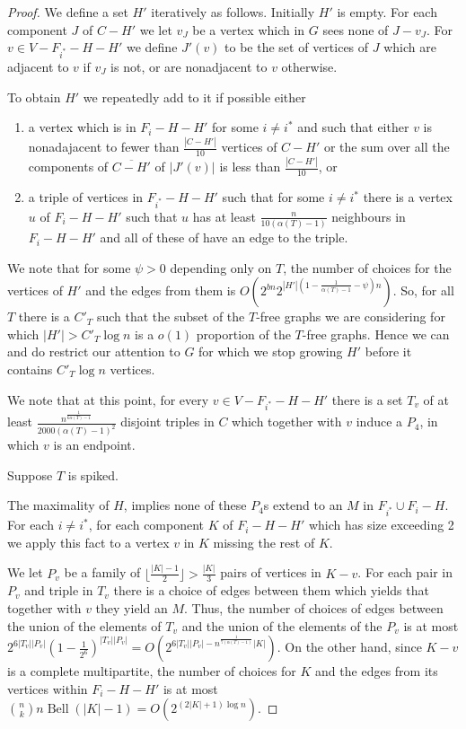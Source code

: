 \documentclass[10pt,a4paper]{amsart}
\DeclareMathOperator{\Bell}{Bell}
\begin{document}
\begin{proof}

We define a set $H'$ iteratively as follows. Initially $H'$ is empty. 
For each component $J$ of $C-H' $ we let $v_J$ be a vertex which in $G$ sees none of $J-v_J$. 
For $v\in V-F_{i^*}-H-H'$ we define $J'(v)$ to be the set of vertices of $J$ which are adjacent to $v$ if $v_J$ is not, or are nonadjacent to $v$ otherwise. 

To obtain  $H'$ we  repeatedly add to it  if possible either 
\begin{enumerate}
\item[(a)]  a vertex which  is  in $F_i-H-H'$ for some $i \neq {i^*}$  and such that either $v$ is nonadajacent to fewer than $\frac{|C-H'|}{10}$
vertices of $C-H'$ or the sum over all the components  of  $\overline{C-H'} $ of  $|J'(v)|$
is less than $\frac{|C-H'|}{10}$, or 
\item[(b)] a triple of vertices   in $F_{i^*}-H-H'$  such that  for some $i \neq {i^*}$  there is a vertex $u$ of $F_i-H-H'$ such that $u$  has at least
$\frac{n}{10(\alpha(T)-1)}$ neighbours in $F_i-H-H'$  and all of these of have an edge to the triple.  
\end{enumerate}

We note that for some $\psi>0$ depending only on $T$,  the number of choices for the vertices of $H'$ and the edges from them is $O(2^{bn}2^{|H'|(1-\frac{1}{\alpha(T)-1}-\psi)n})$. 
So, for all $T$ there is a $C'_T$ such that  the subset of the $T$-free graphs  we are considering for which $|H'|>C'_T \log n$ is a $o(1)$ proportion of the $T$-free graphs. 
Hence we can  and do restrict our attention to $G$ for which we stop growing $H'$ before it contains $C'_T \log n$ vertices. 


We note that at this point, for every $v \in V-F_{i^*}-H-H'$  there  is a set $T_v$ of at least $\frac{n^{\frac{1}{6\alpha(T)-1}}}{2000(\alpha(T)-1)^2}$ disjoint triples  in $C$ which together with $v$ induce a $P_4$, in which $v$ is an endpoint. 

Suppose $T$ is spiked. 

The maximality of $H$,  implies  none of these $P_4$s extend to an  $M$ in $F_{i^*} \cup F_i-H$.
For each $i \neq i^*$,  for each component $K$ of $F_i-H-H'$ which has size exceeding 2
we apply  this fact to a vertex  $v$ in $K$ missing the rest of $K$. 


We let $P_v$  be a family of $\lfloor \frac{|K|-1}{2} \rfloor>\frac{|K|}{3}$ pairs 
of vertices in $K-v$. For each pair in $P_v$ and triple in $T_v$ there is a choice of edges between them which yields that together 
with $v$ they yield an $M$. Thus, the number of choices of edges between the union of the elements of $T_v$ and the union of the elements 
of the $P_v$ is at most $2^{6|T_v||P_v|}(1-\frac{1}{2^6})^{|T_v||P_v|}= O( 2^{6|T_v||P_v|- n^{\frac{1}{7(\alpha(T)-1)}}|K|})$. 
On the other hand,  since $K-v$ is a complete multipartite,  the number of choices for $K$ and the edges from its vertices within $F_i-H-H'$  is at most ${n \choose k}n \Bell(|K|-1)
=O(2^{(2|K|+1)\log n})$. 


\end{proof}
\end{document}
